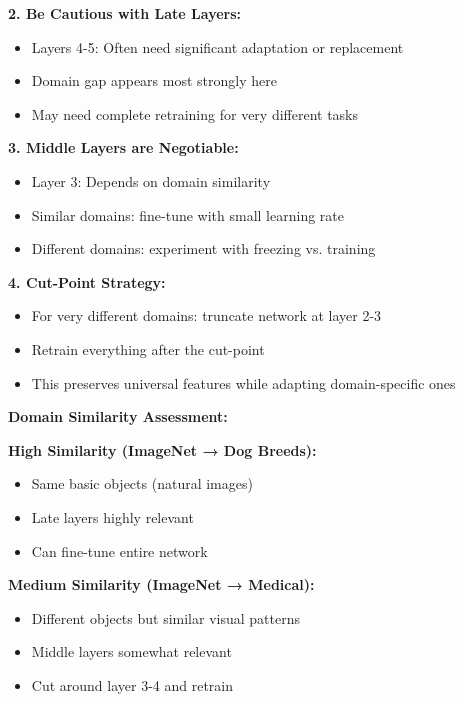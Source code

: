 \documentclass[12pt]{article}
\newcommand{\explanation}[1]{{\color{explanationcolor}#1}}
\begin{document}
\begin{enumerate}[(a)]
{{    \textbf{2. Be Cautious with Late Layers:}
    \begin{itemize}
        \item Layers 4-5: Often need significant adaptation or replacement
        \item Domain gap appears most strongly here
        \item May need complete retraining for very different tasks
    \end{itemize}
    
    \textbf{3. Middle Layers are Negotiable:}
    \begin{itemize}
        \item Layer 3: Depends on domain similarity
        \item Similar domains: fine-tune with small learning rate
        \item Different domains: experiment with freezing vs. training
    \end{itemize}
    
    \textbf{4. Cut-Point Strategy:}
    \begin{itemize}
        \item For very different domains: truncate network at layer 2-3
        \item Retrain everything after the cut-point
        \item This preserves universal features while adapting domain-specific ones
    \end{itemize}
    }
    
    \textbf{Domain Similarity Assessment:}
    
    \explanation{
    \textbf{High Similarity (ImageNet → Dog Breeds):}
    \begin{itemize}
        \item Same basic objects (natural images)
        \item Late layers highly relevant
        \item Can fine-tune entire network
    \end{itemize}
    
    \textbf{Medium Similarity (ImageNet → Medical):}
    \begin{itemize}
        \item Different objects but similar visual patterns
        \item Middle layers somewhat relevant
        \item Cut around layer 3-4 and retrain
    \end{itemize}
    
}}
\end{enumerate}
\end{document}
